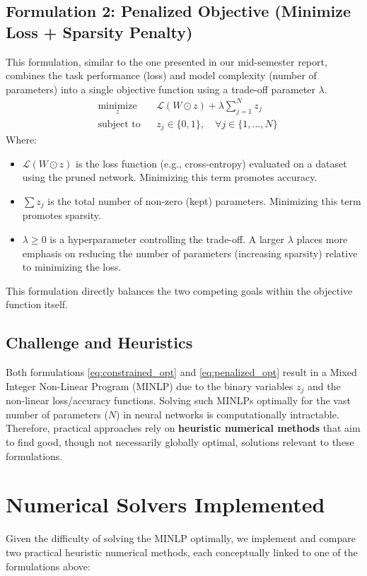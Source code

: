 \documentclass[10pt, article]{article} %
\begin{document}
\subsection{Formulation 2: Penalized Objective (Minimize Loss + Sparsity Penalty)}
This formulation, similar to the one presented in our mid-semester report, combines the task performance (loss) and model complexity (number of parameters) into a single objective function using a trade-off parameter $\lambda$.
\begin{equation} \label{eq:penalized_opt}
\begin{aligned}
& \underset{z}{\text{minimize}}
& & \mathcal{L}(W \odot z) + \lambda \sum_{j=1}^{N} z_j \\
& \text{subject to}
& & z_j \in \{0, 1\}, \quad \forall j \in \{1, ..., N\}
\end{aligned}
\end{equation}
Where:
\begin{itemize}
    \item $\mathcal{L}(W \odot z)$ is the loss function (e.g., cross-entropy) evaluated on a dataset using the pruned network. Minimizing this term promotes accuracy.
    \item $\sum z_j$ is the total number of non-zero (kept) parameters. Minimizing this term promotes sparsity.
    \item $\lambda \ge 0$ is a hyperparameter controlling the trade-off. A larger $\lambda$ places more emphasis on reducing the number of parameters (increasing sparsity) relative to minimizing the loss.
\end{itemize}
This formulation directly balances the two competing goals within the objective function itself.

\subsection{Challenge and Heuristics}
Both formulations \eqref{eq:constrained_opt} and \eqref{eq:penalized_opt} result in a Mixed Integer Non-Linear Program (MINLP) due to the binary variables $z_j$ and the non-linear loss/accuracy functions. Solving such MINLPs optimally for the vast number of parameters ($N$) in neural networks is computationally intractable. Therefore, practical approaches rely on \textbf{heuristic numerical methods} that aim to find good, though not necessarily globally optimal, solutions relevant to these formulations.

\section{Numerical Solvers Implemented}
Given the difficulty of solving the MINLP optimally, we implement and compare two practical heuristic numerical methods, each conceptually linked to one of the formulations above:
\end{document}
